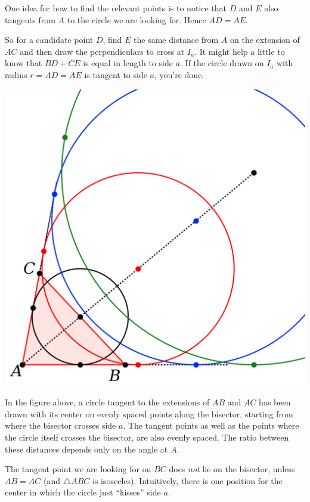 \documentclass[11pt, oneside]{article}
\begin{document}
One idea for how to find the relevant points is to notice that $D$ and $E$ also tangents from $A$ to the circle we are looking for.  Hence $AD = AE$.  

So for a candidate point $D$, find $E$ the same distance from $A$ on the extension of $AC$ and then draw the perpendiculars to cross at $I_a$.  It might help a little to know that $BD + CE$ is equal in length to side $a$.  If the circle drawn on $I_a$ with radius $r = AD = AE$ is tangent to side $a$, you're done.  

\begin{center} \includegraphics [scale=0.40] {excircle_crop3.png} \end{center}

In the figure above, a circle tangent to the extensions of $AB$ and $AC$ has been drawn with its center on evenly spaced points along the bisector, starting from where the bisector crosses side $a$.  The tangent points as well as the points where the circle itself crosses the bisector, are also evenly spaced.  The ratio between these distances depends only on the angle at $A$.  

The tangent point we are looking for on $BC$ does \emph{not} lie on the bisector, unless $AB = AC$ (and $\triangle ABC$ is isosceles).  Intuitively, there is one position for the center in which the circle just ``kisses'' side $a$.
\end{document}
